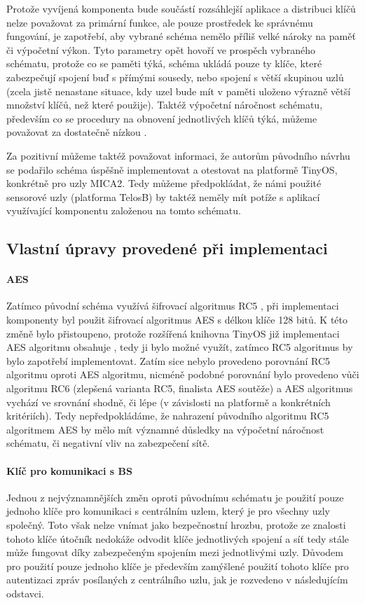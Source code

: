 \documentclass[11pt,final,twoside]{fithesis2}
\begin{document}
Protože vyvíjená komponenta bude součástí rozsáhlejší aplikace a distribuci klíčů nelze považovat za primární funkce, ale pouze prostředek ke správnému fungování, je zapotřebí, aby vybrané schéma 
nemělo příliš velké nároky na paměť či výpočetní výkon. Tyto parametry opět hovoří ve prospěch vybraného schématu, protože co se paměti týká, schéma ukládá pouze ty klíče, které zabezpečují spojení 
buď s přímými sousedy,  nebo spojení s větší skupinou uzlů (zcela jistě nenastane situace, kdy uzel bude mít v paměti uloženo výrazně větší množství klíčů, než které použije). Taktéž výpočetní náročnost 
schématu, především co se procedury na obnovení jednotlivých klíčů týká, můžeme považovat za dostatečně nízkou \cite{Zhu2006}. 

Za pozitivní můžeme taktéž považovat informaci, že autorům původního návrhu se podařilo schéma úspěšně implementovat a otestovat na platformě TinyOS, konkrétně pro uzly MICA2. Tedy můžeme předpokládat, že 
námi použité sensorové uzly (platforma TelosB) by taktéž neměly mít potíže s aplikací využívající komponentu založenou na tomto schématu.


\subsection{Vlastní úpravy provedené při implementaci}

\paragraph{AES}
Zatímco původní schéma využívá šifrovací algoritmus RC5 \cite{Zhu2006}\cite{Rivest1995}, při implementaci komponenty byl použit šifrovací algoritmus AES \cite{Daemen1999} s délkou
klíče 128 bitů. K této změně bylo přistoupeno, protože rozšířená knihovna TinyOS již implementaci AES algoritmu obsahuje \cite{Pelissier}, tedy ji bylo možné využít, zatímco RC5 algoritmus by bylo
zapotřebí implementovat. Zatím sice nebylo provedeno porovnání RC5 algoritmu oproti AES algoritmu, nicméně podobné porovnání bylo provedeno vůči algoritmu RC6 \cite{Rivest1998} (zlepšená varianta RC5, 
finalista AES soutěže) a AES algoritmus vychází ve srovnání shodně, či lépe \cite{Schneier1999} (v závislosti na platformě a konkrétních kritériích). Tedy nepředpokládáme, že nahrazení původního 
algoritmu RC5 algoritmem AES by mělo mít významné důsledky na výpočetní náročnost schématu, či negativní vliv na zabezpečení sítě.

\paragraph{Klíč pro komunikaci s BS}
Jednou z nejvýznamnějších změn oproti původnímu schématu je použití pouze jednoho klíče pro komunikaci s centrálním uzlem, který je pro všechny uzly společný. Toto však nelze vnímat jako bezpečnostní hrozbu, 
protože ze znalosti tohoto klíče útočník nedokáže odvodit klíče jednotlivých spojení a síť tedy stále může fungovat díky zabezpečeným spojením mezi jednotlivými uzly. Důvodem pro použití pouze jednoho klíče 
je především zamýšlené použití tohoto klíče pro autentizaci zpráv posílaných z centrálního uzlu, jak je rozvedeno v následujícím odstavci.
\end{document}
